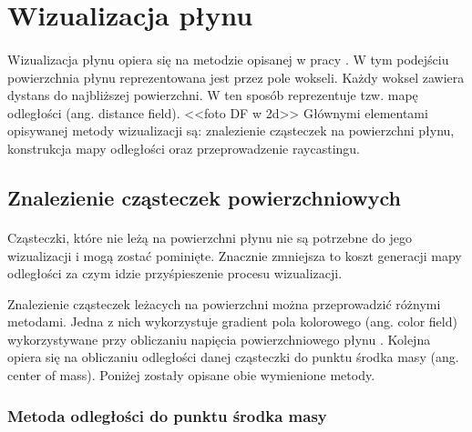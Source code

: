 \newpage

\section{Wizualizacja płynu}

\paragraph{}
Wizualizacja płynu opiera się na metodzie opisanej w pracy \cite{goswami10}. W tym podejściu powierzchnia płynu reprezentowana jest przez pole wokseli. Każdy woksel zawiera dystans do najbliższej powierzchni. W ten sposób reprezentuje tzw. mapę odległości (ang. distance field). <<foto DF w 2d>>
Głównymi elementami opisywanej metody wizualizacji są: znalezienie cząsteczek na powierzchni płynu, konstrukcja mapy odległości oraz przeprowadzenie raycastingu.
\par

\subsection{Znalezienie cząsteczek powierzchniowych}

\paragraph{}
Cząsteczki, które nie leżą na powierzchni płynu nie są potrzebne do jego wizualizacji i mogą zostać pominięte. Znacznie zmniejsza to koszt generacji mapy odległości za czym idzie przyśpieszenie procesu wizualizacji.
\par
Znalezienie cząsteczek leżacych na powierzchni można przeprowadzić różnymi metodami. Jedna z nich wykorzystuje gradient pola kolorowego (ang. color field) wykorzystywane przy obliczaniu napięcia powierzchniowego płynu \cite{kelager06}. Kolejna opiera się na obliczaniu odległości danej cząsteczki do punktu środka masy (ang. center of mass). Poniżej zostały opisane obie wymienione metody.

\subsubsection{Metoda odległości do punktu środka masy}

